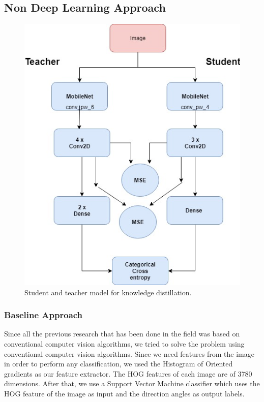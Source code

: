 \documentclass[extendedabs]{bmvc2k}
\begin{document}
\subsection{Non Deep Learning Approach}
\begin{figure}[t]
\includegraphics[width=\linewidth]{images/KD.jpg}
\caption{
Student and teacher model for knowledge distillation.}
\label{fig:KD}
\vspace{-2mm}
\end{figure}
\subsubsection{Baseline Approach}
Since all the previous research that has been done in the field was based on conventional computer vision algorithms, we tried to solve the problem using conventional computer vision algorithms. Since we need features from the image in order to perform any classification, we used the Histogram of Oriented gradients \cite{dalal2005histograms} as our feature extractor. The HOG features of each image are of 3780 dimensions. After that, we use a Support Vector Machine classifier \cite{hearst1998support} which uses the HOG feature of the image as input and the direction angles as output labels.
\end{document}
